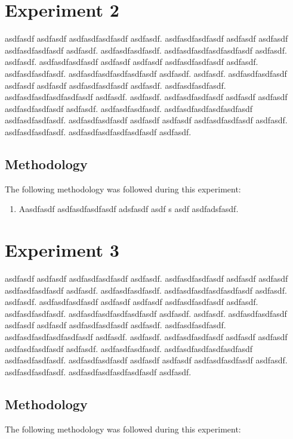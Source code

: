 \documentclass[runningheads,a4paper]{llncs}
\begin{document}
\section*{Experiment 2}
asdfasdf asdfasdf asdfasdfasdfasdf asdfasdf. asdfasdfasdfasdf asdfasdf asdfasdf asdfasdfasdfasdf asdfasdf. asdfasdfasdfasdf. asdfasdfasdfasdfasdfasdf asdfasdf. asdfasdf. asdfasdfasdfasdf asdfasdf asdfasdf asdfasdfasdfasdf asdfasdf. asdfasdfasdfasdf. asdfasdfasdfasdfasdfasdf asdfasdf. asdfasdf. asdfasdfasdfasdf asdfasdf asdfasdf asdfasdfasdfasdf asdfasdf. asdfasdfasdfasdf. asdfasdfasdfasdfasdfasdf asdfasdf. asdfasdf. asdfasdfasdfasdf asdfasdf asdfasdf asdfasdfasdfasdf asdfasdf. asdfasdfasdfasdf. asdfasdfasdfasdfasdfasdf asdfasdfasdfasdf. asdfasdfasdfasdf asdfasdf asdfasdf asdfasdfasdfasdf asdfasdf. asdfasdfasdfasdf. asdfasdfasdfasdfasdfasdf asdfasdf.


\subsection*{Methodology}
The following methodology was followed during this experiment:

\begin{enumerate}
	\item Aasdfasdf asdfasdfasdfasdf adsfasdf asdf s asdf  asdfadsfasdf. 
\end{enumerate}



\section*{Experiment 3}
asdfasdf asdfasdf asdfasdfasdfasdf asdfasdf. asdfasdfasdfasdf asdfasdf asdfasdf asdfasdfasdfasdf asdfasdf. asdfasdfasdfasdf. asdfasdfasdfasdfasdfasdf asdfasdf. asdfasdf. asdfasdfasdfasdf asdfasdf asdfasdf asdfasdfasdfasdf asdfasdf. asdfasdfasdfasdf. asdfasdfasdfasdfasdfasdf asdfasdf. asdfasdf. asdfasdfasdfasdf asdfasdf asdfasdf asdfasdfasdfasdf asdfasdf. asdfasdfasdfasdf. asdfasdfasdfasdfasdfasdf asdfasdf. asdfasdf. asdfasdfasdfasdf asdfasdf asdfasdf asdfasdfasdfasdf asdfasdf. asdfasdfasdfasdf. asdfasdfasdfasdfasdfasdf asdfasdfasdfasdf. asdfasdfasdfasdf asdfasdf asdfasdf asdfasdfasdfasdf asdfasdf. asdfasdfasdfasdf. asdfasdfasdfasdfasdfasdf asdfasdf.


\subsection*{Methodology}
The following methodology was followed during this experiment:
\end{document}
